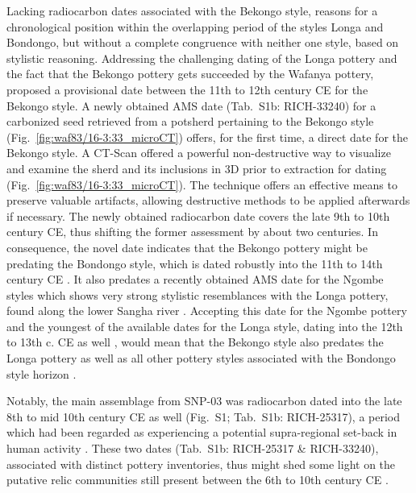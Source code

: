 \documentclass[preprint,10pt,oneside,onecolumn,authoryear]{elsarticle}
\begin{document}
Lacking radiocarbon dates associated with the Bekongo style, \citet[162]{Wotzka.1995} reasons for a chronological position within the overlapping period of the styles Longa and Bondongo, but without a complete congruence with neither one style, based on stylistic reasoning. Addressing the challenging dating of the Longa pottery and the fact that the Bekongo pottery gets succeeded by the Wafanya pottery, \citet[198]{Seidensticker.2021e} proposed a provisional date between the 11th to 12th century CE for the Bekongo style. A newly obtained AMS date (Tab.~S1b: RICH-33240) for a carbonized seed retrieved from a potsherd pertaining to the Bekongo style (Fig.~\ref{fig:waf83/16-3:33_microCT}) offers, for the first time, a direct date for the Bekongo style. A {\textmu}CT-Scan offered a powerful non-destructive way to visualize and examine the sherd and its inclusions in 3D prior to extraction for dating (Fig.~\ref{fig:waf83/16-3:33_microCT}). The technique offers an effective means to preserve valuable artifacts, allowing destructive methods to be applied afterwards if necessary. The newly obtained radiocarbon date covers the late 9th to 10th century CE, thus shifting the former assessment by about two centuries. In consequence, the novel date indicates that the Bekongo pottery might be predating the Bondongo style, which is dated robustly into the 11th to 14th century CE \citep[138 Tab.~58]{Wotzka.1995}. It also predates a recently obtained AMS date for the Ngombe styles which shows very strong stylistic resemblances with the Longa pottery, found along the lower Sangha river \citep[12th to 13th c. CE; RICH-30867 in][Tab.~2]{Seidensticker.2024}. Accepting this date for the Ngombe pottery and the youngest of the available dates for the Longa style, dating into the 12th to 13th c. CE as well \citep[Hv-11572 in][127 Tab. 53]{Wotzka.1995}, would mean that the Bekongo style also predates the Longa pottery as well as all other pottery styles associated with the Bondongo style horizon \citep[224--225]{Wotzka.1995}.

Notably, the main assemblage from SNP-03 was radiocarbon dated into the late 8th to mid 10th century CE as well (Fig.~S1; Tab.~S1b: RICH-25317), a period which had been regarded as experiencing a potential supra-regional set-back in human activity \citep{Seidensticker.2021}. These two dates (Tab.~S1b: RICH-25317 \& RICH-33240), associated with distinct pottery inventories, thus might shed some light on the putative relic communities still present between the 6th to 10th century CE \citep[Fig.~S4]{Seidensticker.2021e}.
\end{document}
